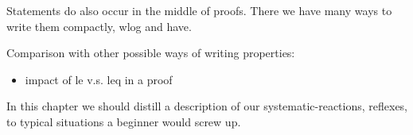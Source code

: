 Statements do also occur in the middle of proofs.  There we have many ways to
write them compactly, wlog and have.

Comparison with other possible ways of writing properties:
\begin{itemize}
\item impact of le v.s. leq in a proof
\end{itemize}

In this chapter we should distill a description of our
systematic-reactions, reflexes, to typical situations a
beginner would screw up.

